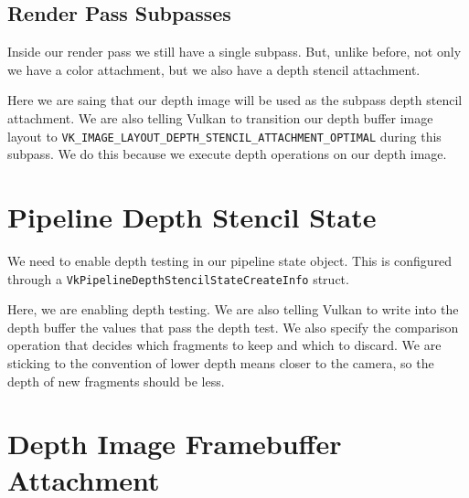 \subsection{Render Pass Subpasses}

Inside our render pass we still have a single subpass.
But, unlike before, not only we have a color attachment, but
we also have a depth stencil attachment.

Here we are saing that our depth image will be used as the subpass depth
stencil attachment.
We are also telling Vulkan to transition our depth buffer image layout to
\texttt{VK\_IMAGE\_LAYOUT\_DEPTH\_STENCIL\_ATTACHMENT\_OPTIMAL} during
this subpass.
We do this because we execute depth operations on our depth image.

\begin{minipage}{\linewidth}{\noindent}
    
\end{minipage}

\section{Pipeline Depth Stencil State}

We need to enable depth testing in our pipeline state object.
This is configured through a \texttt{VkPipelineDepthStencilStateCreateInfo}
struct.

Here, we are enabling depth testing.
We are also telling Vulkan to write into the depth buffer the values that
pass the depth test.
We also specify the comparison operation that decides which fragments to
keep and which to discard.
We are sticking to the convention of lower depth means closer to the camera,
so the depth of new fragments should be less.

\begin{minipage}{\linewidth}{\noindent}
    
\end{minipage}

\section{Depth Image Framebuffer Attachment}

